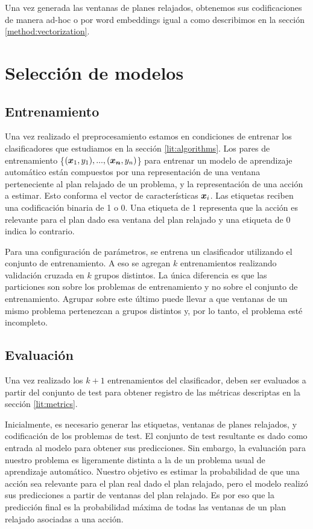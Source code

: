 Una vez generada las ventanas de planes relajados, obtenemos sus codificaciones
de manera ad-hoc o por word embeddings igual a como describimos en la sección
\ref{method:vectorization}.

\section{Selección de modelos}
\label{method:model_selection}

\subsection{Entrenamiento}

Una vez realizado el preprocesamiento estamos en condiciones de entrenar los
clasificadores que estudiamos en la sección \ref{lit:algorithms}. Los pares de
entrenamiento \{$(\boldsymbol{x}_1, y_1), ..., (\boldsymbol{x_n}, y_n)$\} para entrenar un
modelo de aprendizaje automático están compuestos por una representación de una
ventana perteneciente al plan relajado de un problema, y la representación de
una acción a estimar. Esto conforma el vector de características $\boldsymbol{x}_i$.
Las etiquetas reciben una codificación binaria de 1 o 0. Una etiqueta de 1
representa que la acción es relevante para el plan dado esa ventana del plan
relajado y una etiqueta de 0 indica lo contrario.

Para una configuración de parámetros, se entrena un clasificador utilizando
el conjunto de entrenamiento. A eso se agregan $k$ entrenamientos realizando
validación cruzada en $k$ grupos distintos. La única diferencia es que las
particiones son sobre los problemas de entrenamiento y no sobre el conjunto de
entrenamiento. Agrupar sobre este último puede llevar a que ventanas de un mismo
problema pertenezcan a grupos distintos y, por lo tanto, el problema esté
incompleto.

\subsection{Evaluación}

Una vez realizado los $k + 1$ entrenamientos del clasificador, deben ser
evaluados a partir del conjunto de test para obtener registro de las métricas
descriptas en la sección \ref{lit:metrics}. 

Inicialmente, es necesario generar las etiquetas, ventanas de planes relajados, y
codificación de los problemas de test. El conjunto de test resultante es dado
como entrada al modelo para obtener sus predicciones. Sin embargo, la evaluación
para nuestro problema es ligeramente distinta a la de un problema usual de
aprendizaje automático. Nuestro objetivo es estimar la probabilidad de que una
acción sea relevante para el plan real dado el plan relajado, pero el modelo
realizó sus predicciones a partir de ventanas del plan relajado. Es por eso que
la predicción final es la probabilidad máxima de todas las ventanas de un plan
relajado asociadas a una acción.

